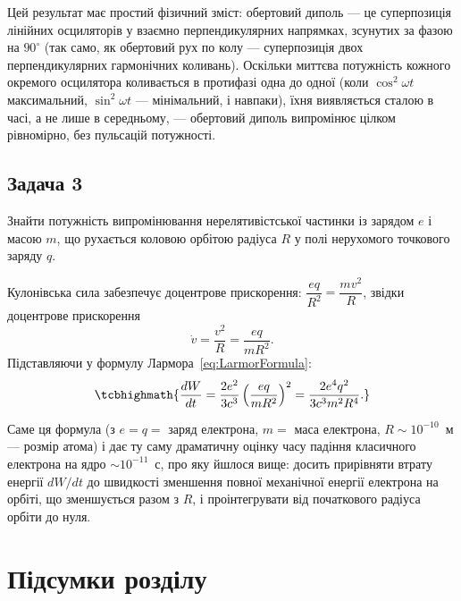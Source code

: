 \begin{Attention}
	Цей результат має простий фізичний зміст: обертовий диполь --- це суперпозиція  лінійних осциляторів у взаємно перпендикулярних
	напрямках, зсунутих за фазою на $90^\circ$ (так само, як обертовий рух по колу --- суперпозиція двох перпендикулярних гармонічних коливань).
	Оскільки миттєва потужність кожного окремого осцилятора коливається в протифазі одна до одної (коли $\cos^2\omega t$ максимальний,
	$\sin^2\omega t$ --- мінімальний, і навпаки), їхня  виявляється сталою в часі, а не лише в середньому, --- обертовий диполь
	випромінює цілком рівномірно, без пульсацій потужності.
\end{Attention}

\subsection*{Задача 3}

 Знайти потужність випромінювання нерелятивістської частинки із зарядом $e$ і масою $m$, що рухається коловою орбітою радіуса $R$
у полі нерухомого точкового заряду $q$.

 Кулонівська сила забезпечує доцентрове прискорення: $\dfrac{eq}{R^2} = \dfrac{mv^2}{R}$, звідки доцентрове прискорення
\begin{equation*}
	\dot v = \frac{v^2}{R} = \frac{eq}{mR^2}.
\end{equation*}
Підставляючи у формулу Лармора~\eqref{eq:LarmorFormula}:
\begin{equation}\label{eq:Problem3Solution}
	\tcbhighmath{
		\frac{dW}{dt} = \frac{2e^2}{3c^3}\left(\frac{eq}{mR^2}\right)^2 = \frac{2e^4q^2}{3c^3m^2R^4}.
	}
\end{equation}

\begin{Attention}
	Саме ця формула (з $e=q=$ заряд електрона, $m=$ маса електрона, $R\sim10^{-10}$~м --- розмір атома) і дає ту саму драматичну оцінку часу
	падіння класичного електрона на ядро $\sim10^{-11}$~с, про яку йшлося вище: досить прирівняти втрату енергії $dW/dt$ до швидкості зменшення
	повної механічної енергії електрона на орбіті, що зменшується разом з $R$, і проінтегрувати від початкового радіуса орбіти до нуля.
\end{Attention}

\section{Підсумки розділу}

